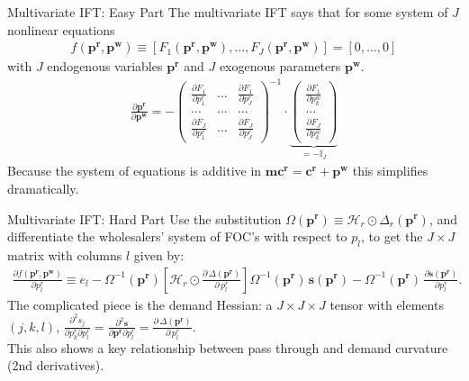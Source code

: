 \begin{frame}{Multivariate IFT: Easy Part}
The multivariate IFT says that for some system of $J$ nonlinear equations 
\begin{align*}
f(\mathbf{p^r},\mathbf{p^w}) \equiv [F_1(\mathbf{p^r},\mathbf{p^w}), \ldots, F_J(\mathbf{p^r},\mathbf{p^w})]=[0,\ldots,0]
\end{align*}
with $J$ endogenous variables $\mathbf{p^r}$ and $J$ exogenous parameters $\mathbf{p^w}$.
\begin{align}
\label{eq:ptr_matrix}
\tag{PTR}
\frac{\partial \mathbf{p^r}}{\partial \mathbf{p^w}}
=-\left(\begin{array}{ccc}
\frac{\partial F_{1}}{\partial p_{1}^r} & \ldots & \frac{\partial F_{1}}{\partial p_{J}^r} \\
\ldots & \ldots & \ldots \\
\frac{\partial F_{J}}{\partial p_{1}^r} & \ldots & \frac{\partial F_{J}}{\partial p_{J}^r}
\end{array}\right)^{-1} \cdot \underbrace{\left(\begin{array}{l}
\frac{\partial F_{1}}{\partial p_{k}^w} \\
\ldots \\
\frac{\partial F_{J}}{\partial p_{k}^w}
\end{array}\right)}_{= -\mathbb{I}_J}
\end{align}
Because the system of equations is additive in $\mathbf{mc^r} = \mathbf{c^r} + \mathbf{p^w}$ this simplifies dramatically.
\end{frame}


\begin{frame}{Multivariate IFT: Hard Part}
Use the substitution $\Omega(\mathbf{p^r}) \equiv \mathcal{H}_r \odot \Delta_{r}(\mathbf{p^r})$, and differentiate the wholesalers' system of FOC's with respect to $p_l$, to get the $J \times J$ matrix with columns $l$ given by:
\begin{align}
\frac{\partial f(\mathbf{p^r},\mathbf{p^w})}{\partial p_l^r} \equiv e_l - \Omega^{-1}(\mathbf{p^r})
\left[  \mathcal{H}_{r} \odot \frac{\partial\, \Delta(\mathbf{p^r})}{\partial\, p_l^r} \right]
\Omega^{-1}(\mathbf{p^r})\,
\mathbf{s}(\mathbf{p^r}) -\Omega^{-1}(\mathbf{p^r})\, \frac{\partial \mathbf{s}(\mathbf{p^r})}{\partial p_l^r}.
\end{align}
The complicated piece is the demand Hessian: a $J \times J \times J$ tensor with elements $(j,k,l)$, $\frac{\partial^2 s_j}{\partial p_k^r \partial p_l^r} = \frac{\partial^2 \mathbf{s}}{\partial \mathbf{p^r} \partial p_l^r}=\frac{\partial\, \Delta(\mathbf{p^r})}{\partial\, p_l^r}$.\\

This also shows a key relationship between \alert{pass through} and \alert{demand curvature} (2nd derivatives).
\end{frame}



